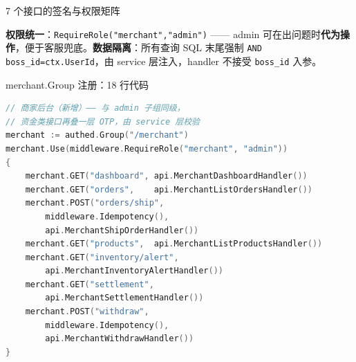 \documentclass[aspectratio=169,11pt]{beamer}
\begin{document}
\begin{frame}[shrink]{7 个接口的签名与权限矩阵}
\noindent{}\par
\vspace{2mm}
{\small \textbf{权限统一}：\texttt{RequireRole("merchant","admin")} —— admin 可在出问题时\textbf{代为操作}，便于客服兜底。\textbf{数据隔离}：所有查询 SQL 末尾强制 \texttt{AND boss\_id=ctx.UserId}，由 service 层注入，handler 不接受 \texttt{boss\_id} 入参。}
\end{frame}

\begin{frame}{merchant.Group 注册：18 行代码}
\begin{lstlisting}[language=Go,firstnumber=1,
  caption={}]
// 商家后台（新增）—— 与 admin 子组同级，
// 资金类接口再叠一层 OTP，由 service 层校验
merchant := authed.Group("/merchant")
merchant.Use(middleware.RequireRole("merchant", "admin"))
{
    merchant.GET("dashboard", api.MerchantDashboardHandler())
    merchant.GET("orders",    api.MerchantListOrdersHandler())
    merchant.POST("orders/ship",
        middleware.Idempotency(),
        api.MerchantShipOrderHandler())
    merchant.GET("products",  api.MerchantListProductsHandler())
    merchant.GET("inventory/alert",
        api.MerchantInventoryAlertHandler())
    merchant.GET("settlement",
        api.MerchantSettlementHandler())
    merchant.POST("withdraw",
        middleware.Idempotency(),
        api.MerchantWithdrawHandler())
}
\end{lstlisting}
\end{frame}
\end{document}
